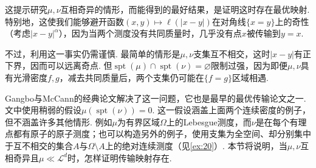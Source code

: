 这提示研究$\mu,\nu$互相奇异的情形，而能得到的最好结果，是证明这时存在最优映射. 特别地，这使我们能够避开函数$(x,y)\mapsto\ell(|x-y|)$在对角线$\{x=y\}$上的奇性（考虑$|x-y|^\alpha$），因为当两个测度没有共同质量时，几乎没有点$x$被传输到$y=x$.

不过，利用这一事实仍需谨慎. 最简单的情形是$\mu,\nu$支集互不相交，这时$|x-y|$有正下界，因而可以远离奇点. 但$\operatorname{spt}(\mu)\cap\operatorname{spt}(\nu)=\varnothing$限制过强，因为即便$\mu,\nu$具有光滑密度$f,g$，减去共同质量后，两个支集仍可能在$\{f=g\}$区域相遇.

Gangbo与McCann的经典论文\cite{b176}解决了这一问题，它也是最早的最优传输论文之一. 文中使用稍弱的假设$\mu(\operatorname{spt}(\nu))=0$. 这一假设涵盖上面两个连续密度的例子，但不涵盖许多其他情形. 例如$\mu$为有界区域$\Omega$上的Lebesgue测度，而$\nu$是在每个有理点都有原子的原子测度；也可以构造另外的例子，使用支集为全空间、却分别集中于互不相交的集合$A$与$\Omega\setminus A$上的绝对连续测度（见\autoref{ex:20}）. 本节将说明，当$\mu,\nu$互相奇异且$\mu\ll\mathscr L^d$时，怎样证明传输映射存在.

